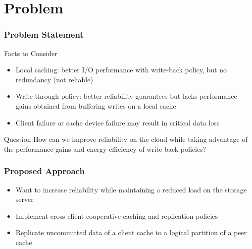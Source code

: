 \section{Problem}
%
\begin{frame}
    \frametitle{Problem Statement}
    \begin{block}{Facts to Consider}
	\begin{itemize}
	    \item Local caching: better I/O performance with
		write-back policy, but no redundancy (not reliable)
	    \item Write-through policy: better reliability guarantees
		but lacks performance gains obtained from buffering
		writes on a local cache
	    \item Client failure or cache device failure may result in
		critical data loss
	\end{itemize}
    \end{block}
    \begin{block}{Question}
	How can we improve reliability on the cloud while taking
	advantage of the performance gains and energy efficiency
	of write-back policies?
    \end{block}
\end{frame}
\begin{frame}
    \frametitle{Proposed Approach}
    \begin{itemize}
	\item Want to increase reliability while maintaining a
	    reduced load on the storage server
	\item Implement cross-client cooperative caching and
	    replication policies
	\item Replicate uncommitted data of a client cache
	    to a logical partition of a peer cache
    \end{itemize}
\end{frame}
